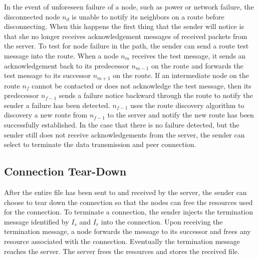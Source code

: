 
In the event of unforeseen failure of a node, such as power or
network failure, the disconnected node $n_d$ is unable to notify
its neighbors on a route before disconnecting. When this happens
the first thing that the sender will notice is that she no longer
receives acknowledgement messages of received packets from the
server. To test for node failure in the path, the sender can send
a route test message into the route. When a node $n_m$ receives
the test message, it sends an acknowledgement back to its
predecessor $n_{m-1}$ on the route and forwards the test message
to its successor $n_{m+1}$ on the route. If an intermediate node
on the route $n_f$ cannot be contacted or does not acknowledge the
test message, then its predecessor $n_{f-1}$ sends a failure
notice backward through the route to notify the sender a failure
has been detected. $n_{f-1}$ uses the route discovery algorithm to
discovery a new route from $n_{f-1}$ to the server and notify the
new route has been successfully established. In the case that
there is no failure detected, but the sender still does not
receive acknowledgements from the server, the sender can select to
terminate the data transmission and peer connection.

\subsection{Connection Tear-Down}

After the entire file has been sent to and received by the server,
the sender can choose to tear down the connection so that the
nodes can free the resources used for the connection. To terminate
a connection, the sender injects the termination message
identified by $I_s$ and $I_r$ into the connection. Upon receiving
the termination message, a node forwards the message to its
successor and frees any resource associated with the connection.
Eventually the termination message reaches the server. The server
frees the resources and stores the received file.
